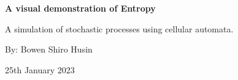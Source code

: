 \begin{titlepage}
    \begin{center} 
       \vspace*{1cm}
       
       \textbf{ \LARGE A visual demonstration of Entropy}

       \vspace{6.5cm}
       \large{A simulation of stochastic processes using cellular automata}.

       \vspace{6.5cm}
       \large{By: Bowen Shiro Husin} \par
       
       \vspace{0.3cm}
       25th January 2023

    
        
    \end{center}
\end{titlepage}